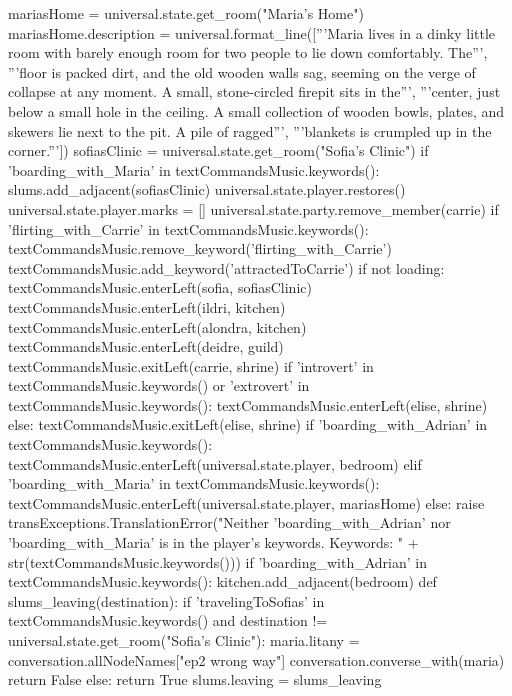 \documentclass{book}
\begin{document}
\begin{openScene}
    mariasHome = universal.state.get_room("Maria's Home")
    mariasHome.description = universal.format_line(['''Maria lives in a dinky little room with barely enough room for two people to lie down comfortably. The''',
    '''floor is packed dirt, and the old wooden walls sag, seeming on the verge of collapse at any moment. A small, stone-circled firepit sits in the''',
    '''center, just below a small hole in the ceiling. A small collection of wooden bowls, plates, and  skewers lie next to the pit. A pile of ragged''',
    '''blankets is crumpled up in the corner.'''])
    sofiasClinic = universal.state.get_room("Sofia's Clinic")
    if 'boarding_with_Maria' in textCommandsMusic.keywords():
        slums.add_adjacent(sofiasClinic)
    universal.state.player.restores()
    universal.state.player.marks = []
    universal.state.party.remove_member(carrie)
    if 'flirting_with_Carrie' in textCommandsMusic.keywords():
        textCommandsMusic.remove_keyword('flirting_with_Carrie')
        textCommandsMusic.add_keyword('attractedToCarrie')
    if not loading:
        textCommandsMusic.enterLeft(sofia, sofiasClinic)
        textCommandsMusic.enterLeft(ildri, kitchen)
        textCommandsMusic.enterLeft(alondra, kitchen)
        textCommandsMusic.enterLeft(deidre, guild)
        textCommandsMusic.exitLeft(carrie, shrine)
        if 'introvert' in textCommandsMusic.keywords() or 'extrovert' in textCommandsMusic.keywords():
            textCommandsMusic.enterLeft(elise, shrine)
        else:
            textCommandsMusic.exitLeft(elise, shrine)
        if 'boarding_with_Adrian' in textCommandsMusic.keywords():
            textCommandsMusic.enterLeft(universal.state.player, bedroom)
        elif 'boarding_with_Maria' in textCommandsMusic.keywords():
            textCommandsMusic.enterLeft(universal.state.player, mariasHome)
        else:
            raise transExceptions.TranslationError("Neither 'boarding_with_Adrian' nor 'boarding_with_Maria' is in the player's keywords. Keywords: " + str(textCommandsMusic.keywords()))
    if 'boarding_with_Adrian' in textCommandsMusic.keywords():
        kitchen.add_adjacent(bedroom)
    def slums_leaving(destination):
        if 'travelingToSofias' in textCommandsMusic.keywords() and destination != universal.state.get_room("Sofia's Clinic"):
            maria.litany = conversation.allNodeNames["ep2 wrong way"]
            conversation.converse_with(maria)
            return False
        else:
            return True
    slums.leaving = slums_leaving
    
\end{openScene}
\end{document}
